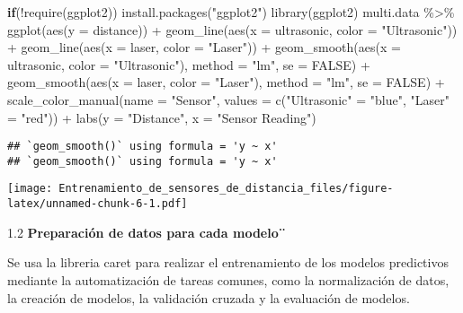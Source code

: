 \documentclass[
]{article}
\newenvironment{Shaded}{\begin{snugshade}}{\end{snugshade}}
\newcommand{\AttributeTok}[1]{\textcolor[rgb]{0.77,0.63,0.00}{#1}}
\newcommand{\ConstantTok}[1]{\textcolor[rgb]{0.00,0.00,0.00}{#1}}
\newcommand{\ControlFlowTok}[1]{\textcolor[rgb]{0.13,0.29,0.53}{\textbf{#1}}}
\newcommand{\FunctionTok}[1]{\textcolor[rgb]{0.00,0.00,0.00}{#1}}
\newcommand{\NormalTok}[1]{#1}
\newcommand{\OtherTok}[1]{\textcolor[rgb]{0.56,0.35,0.01}{#1}}
\newcommand{\SpecialCharTok}[1]{\textcolor[rgb]{0.00,0.00,0.00}{#1}}
\newcommand{\StringTok}[1]{\textcolor[rgb]{0.31,0.60,0.02}{#1}}
\begin{document}
\begin{Shaded}
\begin{Highlighting}[]
\ControlFlowTok{if}\NormalTok{(}\SpecialCharTok{!}\FunctionTok{require}\NormalTok{(ggplot2))}
  \FunctionTok{install.packages}\NormalTok{(}\StringTok{"ggplot2"}\NormalTok{)}
\FunctionTok{library}\NormalTok{(ggplot2)}
\NormalTok{multi.data }\SpecialCharTok{\%\textgreater{}\%} 
    \FunctionTok{ggplot}\NormalTok{(}\FunctionTok{aes}\NormalTok{(}\AttributeTok{y =}\NormalTok{ distance)) }\SpecialCharTok{+}
    \FunctionTok{geom\_line}\NormalTok{(}\FunctionTok{aes}\NormalTok{(}\AttributeTok{x =}\NormalTok{ ultrasonic, }\AttributeTok{color =} \StringTok{"Ultrasonic"}\NormalTok{)) }\SpecialCharTok{+}
    \FunctionTok{geom\_line}\NormalTok{(}\FunctionTok{aes}\NormalTok{(}\AttributeTok{x =}\NormalTok{ laser, }\AttributeTok{color =} \StringTok{"Laser"}\NormalTok{)) }\SpecialCharTok{+}
    \FunctionTok{geom\_smooth}\NormalTok{(}\FunctionTok{aes}\NormalTok{(}\AttributeTok{x =}\NormalTok{ ultrasonic, }\AttributeTok{color =} \StringTok{"Ultrasonic"}\NormalTok{), }\AttributeTok{method =} \StringTok{"lm"}\NormalTok{, }\AttributeTok{se =} \ConstantTok{FALSE}\NormalTok{) }\SpecialCharTok{+}
    \FunctionTok{geom\_smooth}\NormalTok{(}\FunctionTok{aes}\NormalTok{(}\AttributeTok{x =}\NormalTok{ laser, }\AttributeTok{color =} \StringTok{"Laser"}\NormalTok{), }\AttributeTok{method =} \StringTok{"lm"}\NormalTok{, }\AttributeTok{se =} \ConstantTok{FALSE}\NormalTok{) }\SpecialCharTok{+}
    \FunctionTok{scale\_color\_manual}\NormalTok{(}\AttributeTok{name =} \StringTok{"Sensor"}\NormalTok{, }\AttributeTok{values =} \FunctionTok{c}\NormalTok{(}\StringTok{"Ultrasonic"} \OtherTok{=} \StringTok{"blue"}\NormalTok{, }\StringTok{"Laser"} \OtherTok{=} \StringTok{"red"}\NormalTok{)) }\SpecialCharTok{+}
    \FunctionTok{labs}\NormalTok{(}\AttributeTok{y =} \StringTok{"Distance"}\NormalTok{, }\AttributeTok{x =} \StringTok{"Sensor Reading"}\NormalTok{)}
\end{Highlighting}
\end{Shaded}

\begin{verbatim}
## `geom_smooth()` using formula = 'y ~ x'
## `geom_smooth()` using formula = 'y ~ x'
\end{verbatim}

\texttt{[image: Entrenamiento\_de\_sensores\_de\_distancia\_files/figure-latex/unnamed-chunk-6-1.pdf]}

1.2 \textbf{Preparación de datos para cada modelo¨}

Se usa la libreria caret para realizar el entrenamiento de los modelos
predictivos mediante la automatización de tareas comunes, como la
normalización de datos, la creación de modelos, la validación cruzada y
la evaluación de modelos.
\end{document}
